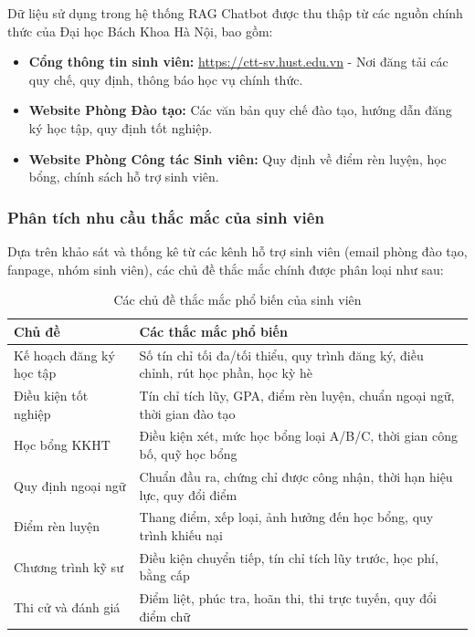 \documentclass[../DoAn.tex]{subfiles}
\begin{document}
Dữ liệu sử dụng trong hệ thống RAG Chatbot được thu thập từ các nguồn chính thức của Đại học Bách Khoa Hà Nội, bao gồm:

\begin{itemize}
    \item \textbf{Cổng thông tin sinh viên:} \url{https://ctt-sv.hust.edu.vn} - Nơi đăng tải các quy chế, quy định, thông báo học vụ chính thức.
    \item \textbf{Website Phòng Đào tạo:} Các văn bản quy chế đào tạo, hướng dẫn đăng ký học tập, quy định tốt nghiệp.
    \item \textbf{Website Phòng Công tác Sinh viên:} Quy định về điểm rèn luyện, học bổng, chính sách hỗ trợ sinh viên.
\end{itemize}

\subsubsection{Phân tích nhu cầu thắc mắc của sinh viên}

Dựa trên khảo sát và thống kê từ các kênh hỗ trợ sinh viên (email phòng đào tạo, fanpage, nhóm sinh viên), các chủ đề thắc mắc chính được phân loại như sau:

\begin{table}[h]
\centering
\begin{tabular}{|l|p{8.5cm}|}
\hline
\textbf{Chủ đề} & \textbf{Các thắc mắc phổ biến} \\
\hline
Kế hoạch đăng ký học tập & Số tín chỉ tối đa/tối thiểu, quy trình đăng ký, điều chỉnh, rút học phần, học kỳ hè \\
\hline
Điều kiện tốt nghiệp & Tín chỉ tích lũy, GPA, điểm rèn luyện, chuẩn ngoại ngữ, thời gian đào tạo \\
\hline
Học bổng KKHT & Điều kiện xét, mức học bổng loại A/B/C, thời gian công bố, quỹ học bổng \\
\hline
Quy định ngoại ngữ & Chuẩn đầu ra, chứng chỉ được công nhận, thời hạn hiệu lực, quy đổi điểm \\
\hline
Điểm rèn luyện & Thang điểm, xếp loại, ảnh hưởng đến học bổng, quy trình khiếu nại \\
\hline
Chương trình kỹ sư & Điều kiện chuyển tiếp, tín chỉ tích lũy trước, học phí, bằng cấp \\
\hline
Thi cử và đánh giá & Điểm liệt, phúc tra, hoãn thi, thi trực tuyến, quy đổi điểm chữ \\
\hline
\end{tabular}
\caption{Các chủ đề thắc mắc phổ biến của sinh viên}
\end{table}
\end{document}
